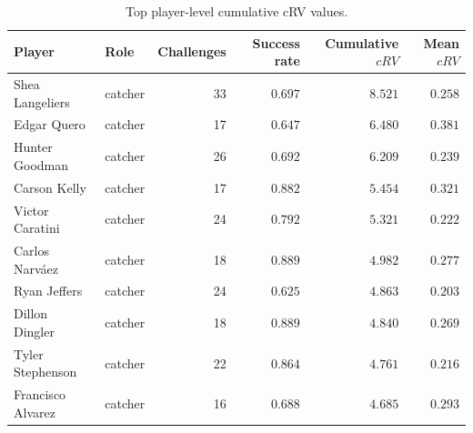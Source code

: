 \begin{table}[h]
\centering
\caption{Top player-level cumulative cRV values.}
\label{tab:leaderboard}
\small
\begin{tabular}{llrrrr}
\toprule
Player & Role & Challenges & Success rate & Cumulative $cRV$ & Mean $cRV$ \\
\midrule
Shea Langeliers & catcher & 33 & $0.697$ & $8.521$ & $0.258$ \\
Edgar Quero & catcher & 17 & $0.647$ & $6.480$ & $0.381$ \\
Hunter Goodman & catcher & 26 & $0.692$ & $6.209$ & $0.239$ \\
Carson Kelly & catcher & 17 & $0.882$ & $5.454$ & $0.321$ \\
Victor Caratini & catcher & 24 & $0.792$ & $5.321$ & $0.222$ \\
Carlos Narváez & catcher & 18 & $0.889$ & $4.982$ & $0.277$ \\
Ryan Jeffers & catcher & 24 & $0.625$ & $4.863$ & $0.203$ \\
Dillon Dingler & catcher & 18 & $0.889$ & $4.840$ & $0.269$ \\
Tyler Stephenson & catcher & 22 & $0.864$ & $4.761$ & $0.216$ \\
Francisco Alvarez & catcher & 16 & $0.688$ & $4.685$ & $0.293$ \\
\bottomrule
\end{tabular}
\end{table}
